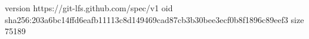 version https://git-lfs.github.com/spec/v1
oid sha256:203a6bc14ffd6eafb11113c8d149469cad87cb3b30bee3ecf0b8f1896c89eef3
size 75189
